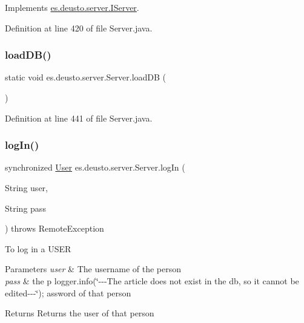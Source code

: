 Implements \hyperlink{interfacees_1_1deusto_1_1server_1_1_i_server_a27b2a5526387404d63d7fc6d0415acd4}{es.\+deusto.\+server.\+I\+Server}.



Definition at line 420 of file Server.\+java.

\mbox{\label{classes_1_1deusto_1_1server_1_1_server_a0517d84248cdc6489471f9e274b6d983}} 
\subsubsection{\texorpdfstring{load\+D\+B()}{loadDB()}}
{\footnotesize\ttfamily static void es.\+deusto.\+server.\+Server.\+load\+DB (\begin{DoxyParamCaption}{ }\end{DoxyParamCaption})\hspace{0.3cm}{\ttfamily [static]}}



Definition at line 441 of file Server.\+java.

\mbox{\label{classes_1_1deusto_1_1server_1_1_server_a5a570da0fbfec7afdf56bd3648fc904f}} 
\subsubsection{\texorpdfstring{log\+In()}{logIn()}}
{\footnotesize\ttfamily synchronized \hyperlink{classes_1_1deusto_1_1server_1_1jdo_1_1_user}{User} es.\+deusto.\+server.\+Server.\+log\+In (\begin{DoxyParamCaption}\item[{String}]{user,  }\item[{String}]{pass }\end{DoxyParamCaption}) throws Remote\+Exception}

To log in a U\+S\+ER


\begin{DoxyParams}{Parameters}
{\em user} & The username of the person \\
\hline
{\em pass} & the p logger.\+info(\char`\"{}-\/-\/-\/\+The article does not exist in the db, so it
            cannot be edited-\/-\/-\/\char`\"{}); assword of that person \\
\hline
\end{DoxyParams}
\begin{DoxyReturn}{Returns}
Returns the user of that person 
\end{DoxyReturn}


